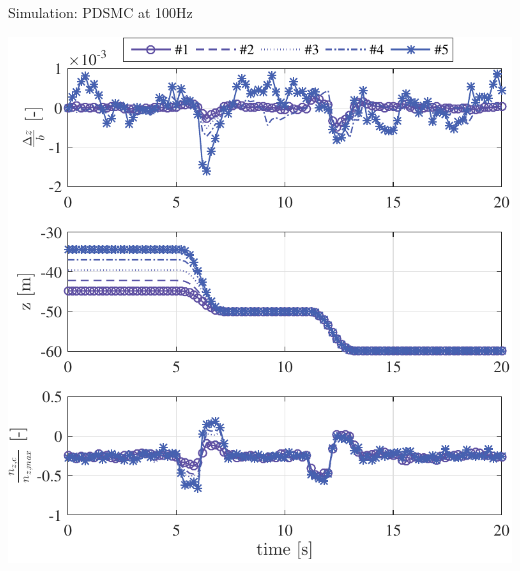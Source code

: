 \documentclass[]{beamer}
\begin{document}

\begin{frame}{Simulation: PDSMC at 100Hz}
\begin{center}
\includegraphics[height=.6\paperwidth]{PDSMC-100Hz-TIMESCALESEPARATION-turbulence=1}    %

\end{center}\end{frame}
\end{document}
